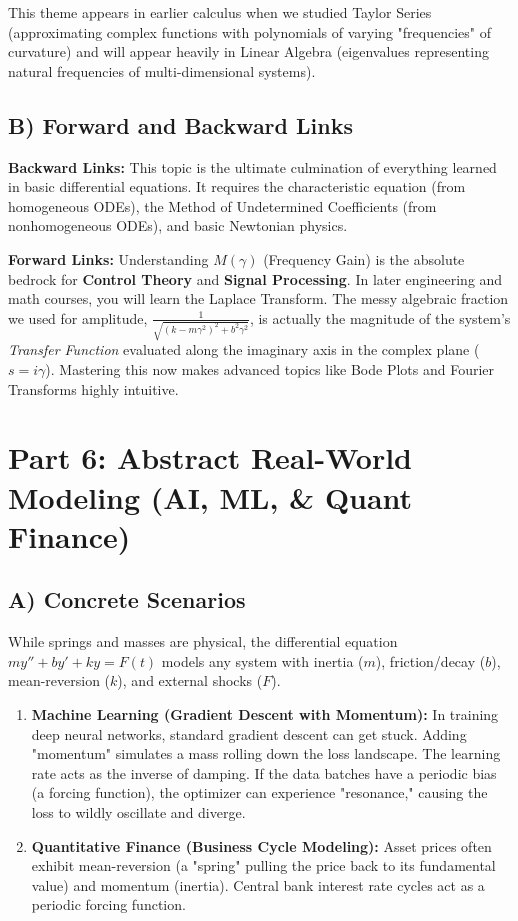 \documentclass[11pt]{article}
\begin{document}
This theme appears in earlier calculus when we studied Taylor Series (approximating complex functions with polynomials of varying "frequencies" of curvature) and will appear heavily in Linear Algebra (eigenvalues representing natural frequencies of multi-dimensional systems).

\subsection{B) Forward and Backward Links}
\textbf{Backward Links:} This topic is the ultimate culmination of everything learned in basic differential equations. It requires the characteristic equation (from homogeneous ODEs), the Method of Undetermined Coefficients (from nonhomogeneous ODEs), and basic Newtonian physics.

\textbf{Forward Links:} Understanding $M(\gamma)$ (Frequency Gain) is the absolute bedrock for \textbf{Control Theory} and \textbf{Signal Processing}. In later engineering and math courses, you will learn the Laplace Transform. The messy algebraic fraction we used for amplitude, $\frac{1}{\sqrt{(k-m\gamma^2)^2 + b^2\gamma^2}}$, is actually the magnitude of the system's \textit{Transfer Function} evaluated along the imaginary axis in the complex plane ($s = i\gamma$). Mastering this now makes advanced topics like Bode Plots and Fourier Transforms highly intuitive.

\newpage
\section{Part 6: Abstract Real-World Modeling (AI, ML, \& Quant Finance)}

\subsection{A) Concrete Scenarios}
While springs and masses are physical, the differential equation $my'' + by' + ky = F(t)$ models any system with inertia ($m$), friction/decay ($b$), mean-reversion ($k$), and external shocks ($F$).
\begin{enumerate}
    \item \textbf{Machine Learning (Gradient Descent with Momentum):} In training deep neural networks, standard gradient descent can get stuck. Adding "momentum" simulates a mass rolling down the loss landscape. The learning rate acts as the inverse of damping. If the data batches have a periodic bias (a forcing function), the optimizer can experience "resonance," causing the loss to wildly oscillate and diverge.
    \item \textbf{Quantitative Finance (Business Cycle Modeling):} Asset prices often exhibit mean-reversion (a "spring" pulling the price back to its fundamental value) and momentum (inertia). Central bank interest rate cycles act as a periodic forcing function.
\end{enumerate}
\end{document}
